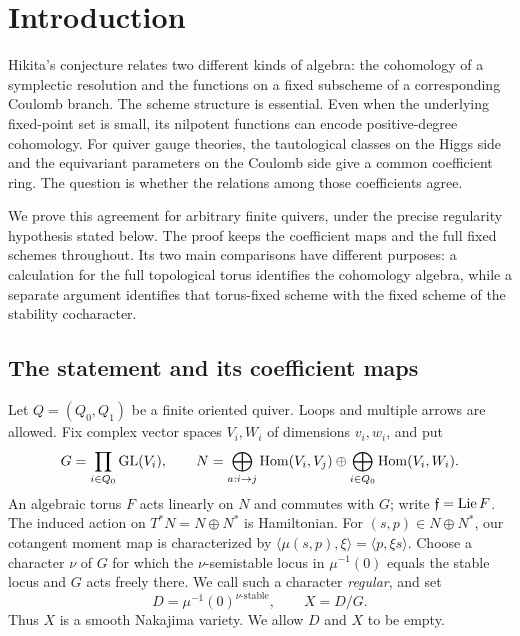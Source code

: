 \section{Introduction}
\label{sec:introduction}

Hikita's conjecture relates two different kinds of algebra: the cohomology
of a symplectic resolution and the functions on a fixed subscheme of a
corresponding Coulomb branch.  The scheme structure is essential.  Even
when the underlying fixed-point set is small, its nilpotent functions can
encode positive-degree cohomology.  For quiver gauge theories, the
tautological classes on the Higgs side and the equivariant parameters on
the Coulomb side give a common coefficient ring.  The question is whether
the relations among those coefficients agree.

We prove this agreement for arbitrary finite quivers, under the precise
regularity hypothesis stated below.  The proof keeps the coefficient maps
and the full fixed schemes throughout.  Its two main comparisons have
different purposes: a calculation for the full topological torus
identifies the cohomology algebra, while a separate argument identifies
that torus-fixed scheme with the fixed scheme of the stability
cocharacter.

\subsection{The statement and its coefficient maps}

Let $Q=(Q_0,Q_1)$ be a finite oriented quiver.  Loops and multiple arrows are
allowed.  Fix complex vector spaces $V_i,W_i$ of dimensions $v_i,w_i$, and put
\begin{equation}\label{eq:gauge-data}
 G=\prod_{i\in Q_0}\operatorname{GL}(V_i),\qquad
 N=\bigoplus_{a:i\to j}\operatorname{Hom}(V_i,V_j)
       \oplus\bigoplus_{i\in Q_0}\operatorname{Hom}(V_i,W_i).
\end{equation}
An algebraic torus $F$ acts linearly on $N$ and commutes with $G$; write
$\mathfrak f=\operatorname{Lie} F$.  The induced action on $T^*N=N\oplus N^*$ is Hamiltonian.
For $(s,p)\in N\oplus N^*$, our cotangent moment map is characterized by
$\langle\mu(s,p),\xi\rangle=\langle p,\xi s\rangle$.
Choose a character $\nu$ of $G$ for which the $\nu$-semistable locus in
$\mu^{-1}(0)$ equals the stable locus and $G$ acts freely there.  We call such
a character \emph{regular}, and set
\begin{equation}\label{eq:higgs-definition}
 D=\mu^{-1}(0)^{\nu\text{-stable}},\qquad X=D/G.
\end{equation}
Thus $X$ is a smooth Nakajima variety.  We allow $D$ and $X$ to be empty.

